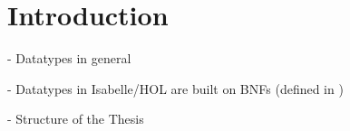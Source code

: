 
\chapter{Introduction}
\label{chapter:introduction}

  - Datatypes in general

  - Datatypes in Isabelle/HOL are built on \acp{BNF} (defined in \cite{traytel2012foundational})

  - Structure of the Thesis
